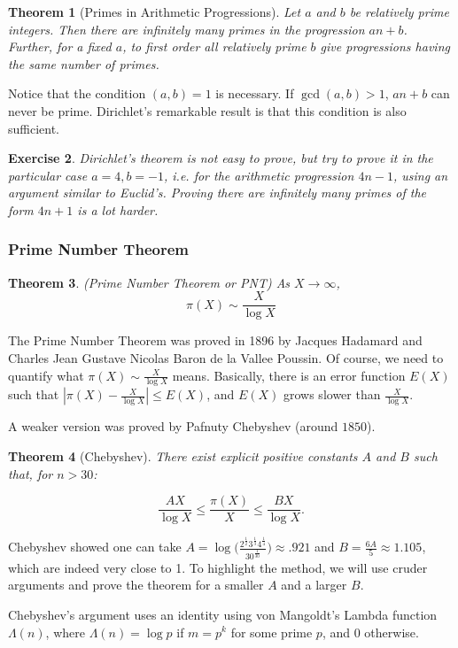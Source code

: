 \documentclass[12pt,letterpaper]{report}
\newcommand\be{\begin{equation}}
\newcommand\ee{\end{equation}}
\newcommand{\foh}{\frac{1}{2}}  %
\newtheorem{thm}{Theorem}[section]
\newtheorem{exe}[thm]{Exercise}
\begin{document}
\begin{thm}[Primes in Arithmetic Progressions] Let $a$ and $b$ be
relatively prime integers. Then there are infinitely many primes
in the progression $an+b$. Further, for a fixed $a$, to first
order all relatively prime $b$ give progressions having the same
number of primes. \end{thm}

Notice that the condition $(a,b)=1$ is necessary. If
$\gcd(a,b)>1$, $an+b$ can never be prime. Dirichlet's remarkable
result is that this condition is also sufficient.

\begin{exe}
Dirichlet's theorem is not easy to prove, but try to prove it in
the particular case $a=4, b=-1$, i.e. for the arithmetic
progression $4n-1$, using an argument similar to Euclid's. Proving
there are infinitely many primes of the form $4n+1$ is a lot
harder.
\end{exe}

\subsubsection{Prime Number Theorem}
\begin{thm}(Prime Number Theorem or PNT)
As $X\rightarrow \infty$, \be \pi(X)\sim \frac{X}{\log X} \ee
\end{thm}
The Prime Number Theorem was proved in 1896 by Jacques Hadamard
and Charles Jean Gustave Nicolas Baron de la Vallee Poussin. Of
course, we need to quantify what $\pi(X)\sim \frac{X}{\log X}$
means. Basically, there is an error function $E(X)$ such that
$|\pi(X) - \frac{X}{\log X}| \le E(X)$, and $E(X)$ grows slower
than $\frac{X}{\log X}$.

A weaker version was proved by Pafnuty Chebyshev (around $1850$).

\begin{thm}[Chebyshev]
There exist explicit positive constants $A$ and $B$ such that, for
$n>30$:

\be \frac{AX}{\log X}\leq \frac {\pi (X)}{X}\leq \frac{BX}{\log
X}. \ee
\end{thm}

Chebyshev showed one can take $A= \log\Big(\frac{2^{\foh}
3^{\frac{1}{3}} 4^{\frac{1}{4}}}{30^{\frac{1}{30}}}\Big) \approx
.921$ and $B= \frac{6A}{5} \approx 1.105$, which are indeed very
close to 1. To highlight the method, we will use cruder arguments
and prove the theorem for a smaller $A$ and a larger $B$.

Chebyshev's argument uses an identity using von Mangoldt's Lambda
function $\Lambda(n)$, where $\Lambda(n) = \log p$ if $m = p^k$
for some prime $p$, and $0$ otherwise.
\end{document}
